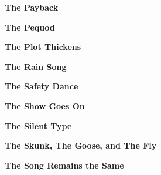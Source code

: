 \newline
\vspace{10pt} 
\begin{center}\textbf{The Payback}\end{center}
\newline
\vspace{10pt} 
\begin{center}\textbf{The Pequod}\end{center}
\newline
\vspace{10pt} 
\begin{center}\textbf{The Plot Thickens}\end{center}
\newline
\vspace{10pt} 
\begin{center}\textbf{The Rain Song}\end{center}
\newline
\vspace{10pt} 
\begin{center}\textbf{The Safety Dance}\end{center}
\newline
\vspace{10pt} 
\begin{center}\textbf{The Show Goes On}\end{center}
\newline
\vspace{10pt} 
\begin{center}\textbf{The Silent Type}\end{center}
\newline
\vspace{10pt} 
\begin{center}\textbf{The Skunk, The Goose, and The Fly}\end{center}
\newline
\vspace{10pt} 
\begin{center}\textbf{The Song Remains the Same}\end{center}
\newline
